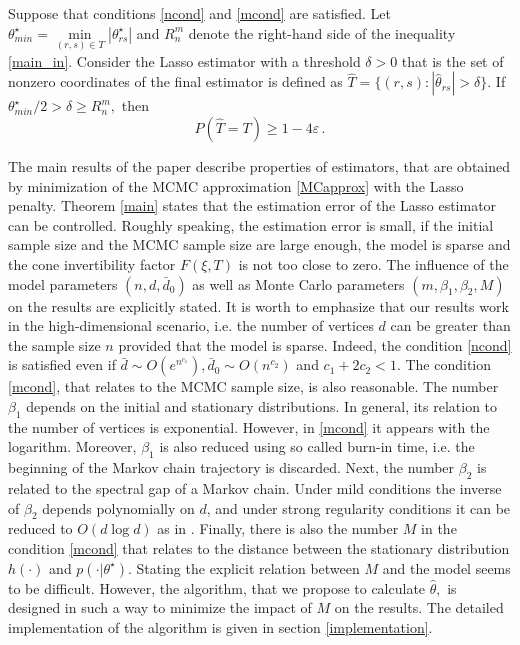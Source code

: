 \documentclass[twoside,11pt]{article}
\def\th{\theta}
\def\ths{\th^\star}
\def\hth{\hat{\theta}}
\def\rs{_{rs}}
\def\bd0{\bar{d} _0}
\def\ef{F(\xi,T)}
\begin{document}
\begin{corollary}
\label{maincor}
Suppose that conditions \eqref{ncond} and \eqref{mcond} are satisfied.
Let  $\ths _{min} = \min\limits_{(r,s) \in T} |\ths \rs|$ and $R_n^m$ denote the right-hand side of the inequality \eqref{main_in}.
Consider the Lasso estimator with a threshold $\delta >0$ that is the set of nonzero coordinates of the final estimator is defined as $\hat{T} = \{(r,s):
|\hth \rs |> \delta\}.$ 
If $ \ths _{min}/2> \delta \geq  R_n^m,$ then 
\[
P\left( \hat{T} = T \right) \geq 1- 4 \varepsilon\,.
\]
\end{corollary}

The main results of the paper describe properties of estimators, that are obtained by minimization of the MCMC approximation \eqref{MCapprox} with the Lasso penalty. Theorem \ref{main} states that the estimation error of the Lasso estimator can be controlled. Roughly speaking, the estimation error is small, if the initial sample size and the MCMC sample size are large enough, the model is sparse and the cone invertibility factor $\ef$ is not too close to zero. The influence of the model parameters $( n,  d, \bd0)$ as well as Monte Carlo parameters $(m,\beta_1, \beta_2, M )$ on the results are explicitly stated. It is worth to emphasize that 
our results work in the high-dimensional scenario, i.e. the number of vertices $d$ can be greater than the sample size $n$ provided that the model is sparse. Indeed, the condition \eqref{ncond} is satisfied even if $\bar{d} \sim O\left(e^{n^{c_1}} \right), \bd0 \sim 
O(n^{c_2})$ and $c_1+2c_2 <1.$ 
The condition \eqref{mcond}, that relates to the MCMC sample size, is also reasonable.
The number $\beta_1$ depends  on the initial and stationary distributions. In general, 
its relation to the number of vertices is exponential. However, in \eqref{mcond} it appears
with the logarithm. Moreover,  $\beta_1$ is also reduced using so called burn-in time,
i.e. the beginning of the Markov chain trajectory is discarded. 
Next, the number $\beta_2$ is related to the spectral gap
of a Markov chain. Under mild conditions the inverse of $\beta_2$ depends polynomially on $d$, and under strong regularity conditions it can be reduced to $ O(d\log d)$ as in \citet{mossel2013exact}. 
Finally, there is also the number $M$ in the condition \eqref{mcond} that relates to the  distance between the stationary distribution $h(\cdot)$ and $p(\cdot|\ths)$. Stating the explicit relation between $M$ and the model seems to be difficult. However,  the algorithm, that we propose to calculate $\hth ,$ is designed in such a way to minimize the impact of $M$ on the results. 
The detailed implementation of the algorithm is given in section \ref{implementation}.
\end{document}
